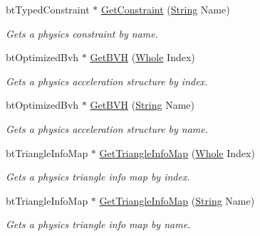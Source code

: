 \begin{DoxyCompactItemize}
btTypedConstraint $\ast$ \hyperlink{classphys_1_1internal_1_1BulletFile_a6c0da3d085e5dddaa7f6fe3e916eacb4}{GetConstraint} (\hyperlink{namespacephys_aa03900411993de7fbfec4789bc1d392e}{String} Name)
\begin{DoxyCompactList}\small\item\em Gets a physics constraint by name. \item\end{DoxyCompactList}\item 
btOptimizedBvh $\ast$ \hyperlink{classphys_1_1internal_1_1BulletFile_a11b7d008dd86c69dda2caff4182efd0e}{GetBVH} (\hyperlink{namespacephys_a460f6bc24c8dd347b05e0366ae34f34a}{Whole} Index)
\begin{DoxyCompactList}\small\item\em Gets a physics acceleration structure by index. \item\end{DoxyCompactList}\item 
btOptimizedBvh $\ast$ \hyperlink{classphys_1_1internal_1_1BulletFile_a844ffb0876061c003b1f633f05de009a}{GetBVH} (\hyperlink{namespacephys_aa03900411993de7fbfec4789bc1d392e}{String} Name)
\begin{DoxyCompactList}\small\item\em Gets a physics acceleration structure by name. \item\end{DoxyCompactList}\item 
btTriangleInfoMap $\ast$ \hyperlink{classphys_1_1internal_1_1BulletFile_a1aeafb312ef9d91d9136b4db7acf1d40}{GetTriangleInfoMap} (\hyperlink{namespacephys_a460f6bc24c8dd347b05e0366ae34f34a}{Whole} Index)
\begin{DoxyCompactList}\small\item\em Gets a physics triangle info map by index. \item\end{DoxyCompactList}\item 
btTriangleInfoMap $\ast$ \hyperlink{classphys_1_1internal_1_1BulletFile_ae7e01fa7e3fd93d42e905de5876d1062}{GetTriangleInfoMap} (\hyperlink{namespacephys_aa03900411993de7fbfec4789bc1d392e}{String} Name)
\begin{DoxyCompactList}\small\item\em Gets a physics triangle info map by name. \item\end{DoxyCompactList}\end{DoxyCompactItemize}
